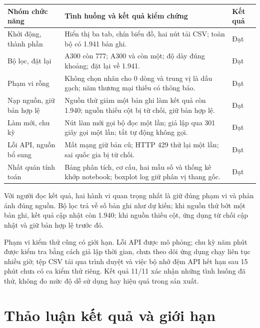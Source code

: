 \begin{center}\begin{minipage}{\linewidth}
\label{tab:ch4test}
\small{}
\begin{tabularx}{\linewidth}{@{}p{3.0cm}Y p{0.9cm}@{}}
\toprule
Nhóm chức năng & Tình huống và kết quả kiểm chứng & Kết quả \\
\midrule
Khởi động, thành phần & Hiển thị ba tab, chín biểu đồ, hai nút tải CSV; toàn bộ có 1.941 bản ghi. & Đạt \\
Bộ lọc, đặt lại & A300 còn 777; A300 và  còn một; độ dày đúng khoảng; đặt lại về 1.941. & Đạt \\
Phạm vi rỗng & Không chọn nhãn cho 0 dòng và trung vị là dấu gạch; năm thương mại thiếu có thông báo. & Đạt \\
Nạp nguồn, giữ bản hợp lệ & Nguồn thử giảm một bản ghi làm kết quả còn 1.940; nguồn thiếu cột bị từ chối, giữ bản hợp lệ. & Đạt \\
Làm mới, chu kỳ & Nút làm mới gọi bộ đọc một lần; giả lập qua 301 giây gọi một lần; tắt tự động không gọi. & Đạt \\
Lỗi API, nguồn bổ sung & Mất mạng giữ bản cũ; HTTP 429 thử lại một lần; sai quốc gia bị từ chối. & Đạt \\
Nhất quán tính toán & Bảng phân tích, cơ cấu, hai mẫu số và thống kê khớp notebook; boxplot log giữ phân vị thang gốc. & Đạt \\
\bottomrule
\end{tabularx}
\end{minipage}\end{center}

Với người đọc kết quả, hai hành vi quan trọng nhất là giữ đúng phạm vi và phản ánh đúng nguồn. Bộ lọc trả về số bản ghi như dự kiến; khi nguồn thử bớt một bản ghi, kết quả cập nhật còn 1.940; khi nguồn thiếu cột, ứng dụng từ chối cập nhật và giữ bản hợp lệ trước đó.

Phạm vi kiểm thử cũng có giới hạn. Lỗi API được mô phỏng; chu kỳ năm phút được kiểm tra bằng cách giả lập thời gian, chưa theo dõi ứng dụng chạy liên tục nhiều giờ; tệp CSV tải qua trình duyệt và việc bộ nhớ đệm API hết hạn sau 15 phút chưa có ca kiểm thử riêng. Kết quả 11/11 xác nhận những tình huống đã thử, không đo mức độ dễ sử dụng hay hiệu quả trong sản xuất.

\section{Thảo luận kết quả và giới hạn}
\label{sec:ch4thaoluan}

